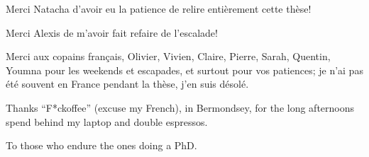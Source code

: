Merci Natacha d'avoir eu la patience de relire enti\`erement cette
th\`ese!

Merci Alexis de m'avoir fait refaire de l'escalade!

Merci aux copains fran\c{c}ais, Olivier, Vivien, Claire,
Pierre, Sarah, Quentin, Youmna pour les weekends et escapades, et
surtout pour vos patiences; je n'ai pas \'et\'e souvent en France
pendant la th\`ese, j'en suis d\'esol\'e.

Thanks ``F*ckoffee'' (excuse my French), in Bermondsey, for the long
afternoons spend behind my laptop and double espressos.

\newpage
\vspace*{\fill}
\begin{adjustbox}{right}
  \begin{it}
    To those who endure the ones doing a PhD.
  \end{it}
\end{adjustbox}
\vspace*{\fill}
